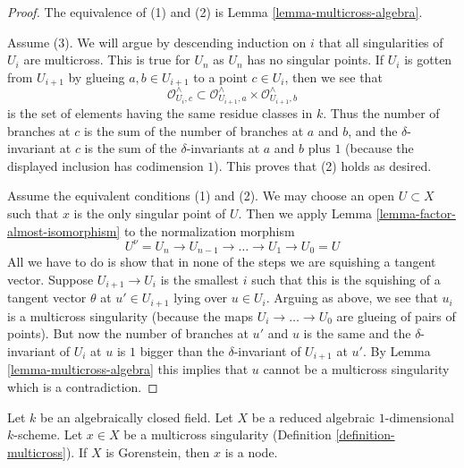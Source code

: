 \begin{proof}
The equivalence of (1) and (2) is Lemma \ref{lemma-multicross-algebra}.

\medskip\noindent
Assume (3). We will argue by descending induction on $i$ that all singularities
of $U_i$ are multicross. This is true for $U_n$ as $U_n$ has no singular points.
If $U_i$ is gotten from $U_{i + 1}$ by glueing $a, b \in U_{i + 1}$
to a point $c \in U_i$, then we see that
$$
\mathcal{O}_{U_i, c}^\wedge \subset
\mathcal{O}_{U_{i + 1}, a}^\wedge \times \mathcal{O}_{U_{i + 1}, b}^\wedge
$$
is the set of elements having the same residue classes in $k$.
Thus the number of branches at $c$ is the sum of the number of
branches at $a$ and $b$, and the $\delta$-invariant at $c$
is the sum of the $\delta$-invariants at $a$ and $b$ plus $1$
(because the displayed inclusion has codimension $1$).
This proves that (2) holds as desired.

\medskip\noindent
Assume the equivalent conditions (1) and (2). We may choose an open
$U \subset X$ such that $x$ is the only singular point of $U$.
Then we apply Lemma \ref{lemma-factor-almost-isomorphism} to
the normalization morphism
$$
U^\nu = U_n \to U_{n - 1} \to \ldots \to U_1 \to U_0 = U
$$
All we have to do is show that in none of the steps we are
squishing a tangent vector. Suppose $U_{i + 1} \to U_i$ is the
smallest $i$ such that this is the squishing of a tangent
vector $\theta$ at $u' \in U_{i + 1}$ lying over $u \in U_i$.
Arguing as above, we see that $u_i$ is a multicross singularity
(because the maps $U_i \to \ldots \to U_0$ are glueing of
pairs of points). But now the number of branches at $u'$ and $u$
is the same and the $\delta$-invariant of $U_i$ at $u$
is $1$ bigger than the $\delta$-invariant of $U_{i + 1}$ at $u'$.
By Lemma \ref{lemma-multicross-algebra}
this implies that $u$ cannot be a multicross singularity which
is a contradiction.
\end{proof}

\begin{lemma}
\label{lemma-multicross-gorenstein-is-nodal}
Let $k$ be an algebraically closed field. Let $X$ be a reduced algebraic
$1$-dimensional $k$-scheme. Let $x \in X$ be a multicross singularity
(Definition \ref{definition-multicross}).
If $X$ is Gorenstein, then $x$ is a node.
\end{lemma}

